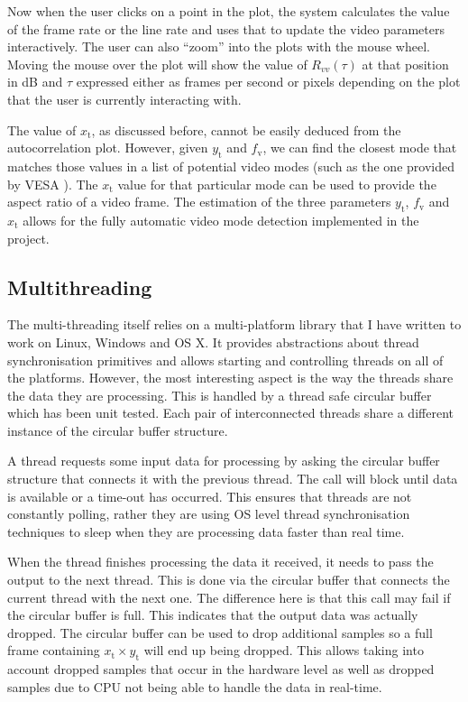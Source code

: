 \documentclass[a4paper,12pt,twoside,openright]{report}
\begin{document}
Now when the user clicks on a point in the plot, the system calculates the value of the frame rate or the line rate and uses that to update the video parameters interactively. The user can also ``zoom'' into the plots with the mouse wheel. Moving the mouse over the plot will show the value of $R_{vv}(\tau)$ at that position in dB and $\tau$ expressed either as frames per second or pixels depending on the plot that the user is currently interacting with. 

The value of $x_\text{t}$, as discussed before, cannot be easily deduced from the autocorrelation plot. However, given $y_\text{t}$ and $f_\text{v}$, we can find the closest mode that matches those values in a list of potential video modes (such as the one provided by VESA \cite{vesa}). The $x_\text{t}$ value for that particular mode can be used to provide the aspect ratio of a video frame. The estimation of the three parameters $y_\text{t}$, $f_\text{v}$ and $x_\text{t}$ allows for the fully automatic video mode detection implemented in the project.

\subsection{Multithreading}

The multi-threading itself relies on a multi-platform library that I have written to work on Linux, Windows and OS X. It provides abstractions about thread synchronisation primitives and allows starting and controlling threads on all of the platforms. However, the most interesting aspect is the way the threads share the data they are processing. This is handled by a thread safe circular buffer which has been unit tested. Each pair of interconnected threads share a different instance of the circular buffer structure.

A thread requests some input data for processing by asking the circular buffer structure that connects it with the previous thread. The call will block until data is available or a time-out has occurred. This ensures that threads are not constantly polling, rather they are using OS level thread synchronisation techniques to sleep when they are processing data faster than real time.

When the thread finishes processing the data it received, it needs to pass the output to the next thread. This is done via the circular buffer that connects the current thread with the next one. The difference here is that this call may fail if the circular buffer is full. This indicates that the output data was actually dropped. The circular buffer can be used to drop additional samples so a full frame containing $x_\text{t} \times y_\text{t}$ will end up being dropped. This allows taking into account dropped samples that occur in the hardware level as well as dropped samples due to CPU not being able to handle the data in real-time.
\end{document}
